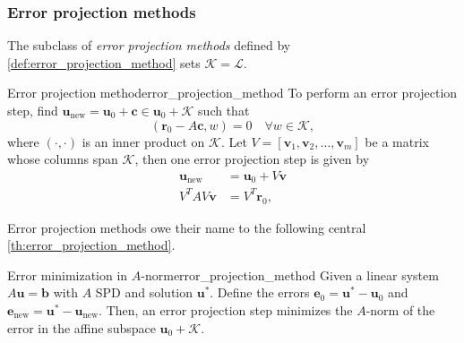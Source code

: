 \subsubsection{Error projection methods}
The subclass of \textit{error projection methods} defined by \cref{def:error_projection_method} sets $\mathcal{K} = \mathcal{L}$.
\begin{fancydef}{Error projection method}{error_projection_method}
  To perform an error projection step, find $\mathbf{u}_{\text{new}} = \mathbf{u}_0 + \mathbf{c} \in \mathbf{u}_0 + \mathcal{K}$ such that
  \begin{equation}
    (\mathbf{r}_0 - A\mathbf{c}, w) = 0 \quad \forall w \in \mathcal{K},
    \label{eq:orthogonality_condition}
  \end{equation}
  where $(\cdot,\cdot)$ is an inner product on $\mathcal{K}$. Let $V = [\mathbf{v}_1, \mathbf{v}_2, \dots, \mathbf{v}_m]$ be a matrix whose columns span $\mathcal{K}$, then one error projection step is given by
  \begin{align*}
    \mathbf{u}_{\text{new}} & = \mathbf{u}_0 + V \mathbf{v} \\
    V^TAV\mathbf{v}         & = V^T\mathbf{r}_0,
  \end{align*}
\end{fancydef}
Error projection methods owe their name to the following central \cref{th:error_projection_method}.
\begin{fancyth}{Error minimization in $A$-norm}{error_projection_method}
  Given a linear system $A\mathbf{u} = \mathbf{b}$ with $A$ SPD and solution $\mathbf{u}^{*}$. Define the errors $\mathbf{e}_0 = \mathbf{u}^{*} - \mathbf{u}_0$ and $\mathbf{e}_{\text{new}} = \mathbf{u}^{*} - \mathbf{u}_{\text{new}}$. Then, an error projection step minimizes the $A$-norm of the error in the affine subspace $\mathbf{u}_0 + \mathcal{K}$.
\end{fancyth}
